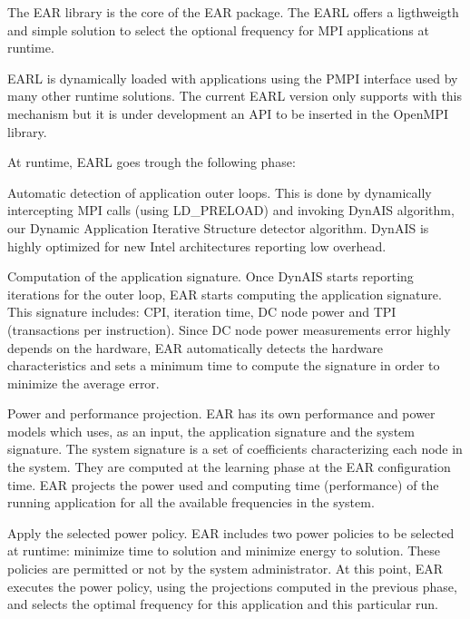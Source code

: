 The E\+AR library is the core of the E\+AR package. The E\+A\+RL offers a ligthweigth and simple solution to select the optional frequency for M\+PI applications at runtime.

E\+A\+RL is dynamically loaded with applications using the P\+M\+PI interface used by many other runtime solutions. The current E\+A\+RL version only supports with this mechanism but it is under development an A\+PI to be inserted in the Open\+M\+PI library.

At runtime, E\+A\+RL goes trough the following phase\+:




\begin{DoxyEnumerate}
\item Automatic detection of application outer loops. This is done by dynamically intercepting M\+PI calls (using L\+D\+\_\+\+P\+R\+E\+L\+O\+AD) and invoking Dyn\+A\+IS algorithm, our Dynamic Application Iterative Structure detector algorithm. Dyn\+A\+IS is highly optimized for new Intel architectures reporting low overhead.
\item Computation of the application signature. Once Dyn\+A\+IS starts reporting iterations for the outer loop, E\+AR starts computing the application signature. This signature includes\+: C\+PI, iteration time, DC node power and T\+PI (transactions per instruction). Since DC node power measurements error highly depends on the hardware, E\+AR automatically detects the hardware characteristics and sets a minimum time to compute the signature in order to minimize the average error.
\end{DoxyEnumerate}




\begin{DoxyEnumerate}
\item Power and performance projection. E\+AR has its own performance and power models which uses, as an input, the application signature and the system signature. The system signature is a set of coefficients characterizing each node in the system. They are computed at the learning phase at the E\+AR configuration time. E\+AR projects the power used and computing time (performance) of the running application for all the available frequencies in the system.
\end{DoxyEnumerate}




\begin{DoxyEnumerate}
\item Apply the selected power policy. E\+AR includes two power policies to be selected at runtime\+: \textquotesingle{}minimize time to solution\textquotesingle{} and \textquotesingle{}minimize energy to solution\textquotesingle{}. These policies are permitted or not by the system administrator. At this point, E\+AR executes the power policy, using the projections computed in the previous phase, and selects the optimal frequency for this application and this particular run.
\end{DoxyEnumerate}

